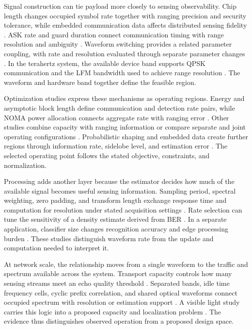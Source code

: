 Signal construction can tie payload more closely to sensing observability.
Chip length changes occupied symbol rate together with ranging precision and
security tolerance, while embedded communication data affects distributed
sensing fidelity \cite{OISAC_SCR00387,OISAC_SCR00647}. ASK rate and guard
duration connect communication timing with range resolution and ambiguity
\cite{OISAC_SCR00887,OISAC_SCR00913}. Waveform switching provides a related
parameter coupling, with rate and resolution evaluated through separate
parameter changes \cite{OISAC_SCR00899}. In the terahertz system, the available
device band supports QPSK communication and the LFM bandwidth used to achieve
range resolution
\cite{OISAC_SCR01000}. The waveform and hardware band together define the
feasible region.

Optimization studies express these mechanisms as operating regions. Energy and
asymptotic block length define communication and detection rate pairs, while
NOMA power allocation connects aggregate rate with ranging error
\cite{OISAC_SCR00761,OISAC_SCR00925}. Other studies combine capacity with
ranging information or compare separate and joint operating configurations
\cite{OISAC_SCR00926,OISAC_SCR00944}. Probabilistic shaping and embedded data
create further regions through information rate, sidelobe level, and
estimation error \cite{OISAC_SCR00974,OISAC_SCR00975}. The selected operating
point follows the stated objective, constraints, and normalization.

Processing adds another layer because the estimator decides how much of the
available signal becomes useful sensing information. Sampling period, spectral
weighting, zero padding, and transform length exchange response time and
computation for resolution under stated acquisition settings
\cite{OISAC_SCR00238,OISAC_SCR00998,OISAC_SCR01018,OISAC_SCR01095}. Rate
selection can tune the sensitivity of a density estimate derived from BER
\cite{OISAC_SCR01021}. In a separate application, classifier size changes
recognition accuracy and edge processing burden \cite{OISAC_SCR01047}. These
studies distinguish waveform rate from the update and computation needed to
interpret it.

At network scale, the relationship moves from a single waveform to the traffic
and spectrum available across the system. Transport capacity controls how many
sensing streams meet an echo quality threshold \cite{OISAC_SCR00436}.
Separated bands, idle time frequency cells, cyclic prefix correlation, and
shared optical waveforms connect occupied spectrum with resolution or
estimation support
\cite{OISAC_SCR00977,OISAC_SCR00981,OISAC_SCR01023,OISAC_SCR01115}. A visible
light study carries this logic into a proposed capacity and localization
problem \cite{OISAC_SCR00488}. The evidence thus distinguishes observed
operation from a proposed design space.

